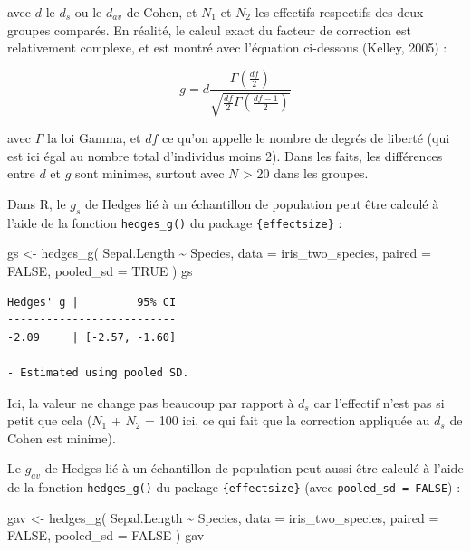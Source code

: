\documentclass[
  letterpaper,
]{book}
\newenvironment{Shaded}{\begin{snugshade}}{\end{snugshade}}
\newcommand{\AttributeTok}[1]{\textcolor[rgb]{0.40,0.45,0.13}{#1}}
\newcommand{\ConstantTok}[1]{\textcolor[rgb]{0.56,0.35,0.01}{#1}}
\newcommand{\FunctionTok}[1]{\textcolor[rgb]{0.28,0.35,0.67}{#1}}
\newcommand{\NormalTok}[1]{\textcolor[rgb]{0.00,0.23,0.31}{#1}}
\newcommand{\OtherTok}[1]{\textcolor[rgb]{0.00,0.23,0.31}{#1}}
\newcommand{\SpecialCharTok}[1]{\textcolor[rgb]{0.37,0.37,0.37}{#1}}
\begin{document}
avec \(d\) le \(d_s\) ou le \(d_{av}\) de Cohen, et \(N_{1}\) et
\(N_{2}\) les effectifs respectifs des deux groupes comparés. En
réalité, le calcul exact du facteur de correction est relativement
complexe, et est montré avec l'équation ci-dessous (Kelley, 2005) :

\[g =  d \frac{\Gamma(\frac{df}{2})}{\sqrt{\frac{df}{2}\Gamma(\frac{df-1}{2})}} \]

avec \(\Gamma\) la loi Gamma, et \(df\) ce qu'on appelle le nombre de
degrés de liberté (qui est ici égal au nombre total d'individus moins
2). Dans les faits, les différences entre \(d\) et \(g\) sont minimes,
surtout avec \(N\) \textgreater{} 20 dans les groupes.

Dans R, le \(g_{s}\) de Hedges lié à un échantillon de population peut
être calculé à l'aide de la fonction \texttt{hedges\_g()} du package
\texttt{\{effectsize\}} :

\begin{Shaded}
\begin{Highlighting}[]
\NormalTok{gs }\OtherTok{\textless{}{-}}
  \FunctionTok{hedges\_g}\NormalTok{(}
\NormalTok{    Sepal.Length }\SpecialCharTok{\textasciitilde{}}\NormalTok{ Species,}
    \AttributeTok{data =}\NormalTok{ iris\_two\_species,}
    \AttributeTok{paired =} \ConstantTok{FALSE}\NormalTok{,}
    \AttributeTok{pooled\_sd =} \ConstantTok{TRUE}
\NormalTok{  )}
\NormalTok{gs}
\end{Highlighting}
\end{Shaded}

\begin{verbatim}
Hedges' g |         95% CI
--------------------------
-2.09     | [-2.57, -1.60]

- Estimated using pooled SD.
\end{verbatim}

Ici, la valeur ne change pas beaucoup par rapport à \(d_s\) car
l'effectif n'est pas si petit que cela (\(N_{1}\) + \(N_{2}\) = 100 ici,
ce qui fait que la correction appliquée au \(d_{s}\) de Cohen est
minime).

Le \(g_{av}\) de Hedges lié à un échantillon de population peut aussi
être calculé à l'aide de la fonction \texttt{hedges\_g()} du package
\texttt{\{effectsize\}} (avec \texttt{pooled\_sd\ =\ FALSE}) :

\begin{Shaded}
\begin{Highlighting}[]
\NormalTok{gav }\OtherTok{\textless{}{-}}
  \FunctionTok{hedges\_g}\NormalTok{(}
\NormalTok{    Sepal.Length }\SpecialCharTok{\textasciitilde{}}\NormalTok{ Species,}
    \AttributeTok{data =}\NormalTok{ iris\_two\_species,}
    \AttributeTok{paired =} \ConstantTok{FALSE}\NormalTok{,}
    \AttributeTok{pooled\_sd =} \ConstantTok{FALSE}
\NormalTok{  )}
\NormalTok{gav}
\end{Highlighting}
\end{Shaded}
\end{document}

